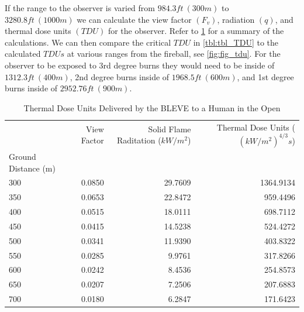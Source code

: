 \documentclass[10pt,parskip=half,
toc=sectionentrywithdots,
bibliography=totocnumbered,
captions=tableheading,numbers=noendperiod]{scrartcl}
\begin{document}
If the range to the observer is varied from \(984.3ft\:(300m)\) to
\(3280.8ft\:(1000m)\) we can calculate the view factor \((F_v)\),
radiation \((q)\), and thermal dose units \((TDU)\) for the observer.
Refer to \cref{tbl:TDU} for a summary of the calculations. We can then
compare the critical \(TDU\) in \cref{tbl:tbl_TDU} to the calculated
\(TDUs\) at various ranges from the fireball, see \cref{fig:fig_tdu}.
For the observer to be exposed to 3rd degree burns they would need to be
inside of \(1312.3ft\:(400m)\), 2nd degree burns inside of
\(1968.5ft\:(600m)\), and 1st degree burns inside of
\(2952.76ft\:(900m)\).

\begin{table}[H]
\caption{Thermal Dose Units Delivered by the BLEVE to a Human in the Open}\label{tbl:TDU}
\centering
\begin{adjustbox}{max width=\textwidth}
\begin{tabular}{lrrr}
\toprule
{} &  View Factor &  Solid Flame Raditation ($kW/m^2$) &  Thermal Dose Units ($(kW/m^2)^{4/3}s$) \\
Ground Distance (m) &              &                                    &                                         \\
\midrule
300                 &       0.0850 &                            29.7609 &                               1364.9134 \\
350                 &       0.0653 &                            22.8472 &                                959.4496 \\
400                 &       0.0515 &                            18.0111 &                                698.7112 \\
450                 &       0.0415 &                            14.5238 &                                524.4272 \\
500                 &       0.0341 &                            11.9390 &                                403.8322 \\
550                 &       0.0285 &                             9.9761 &                                317.8266 \\
600                 &       0.0242 &                             8.4536 &                                254.8573 \\
650                 &       0.0207 &                             7.2506 &                                207.6883 \\
700                 &       0.0180 &                             6.2847 &                                171.6423 \\

\end{tabular}
\end{adjustbox}
\end{table}
\end{document}
